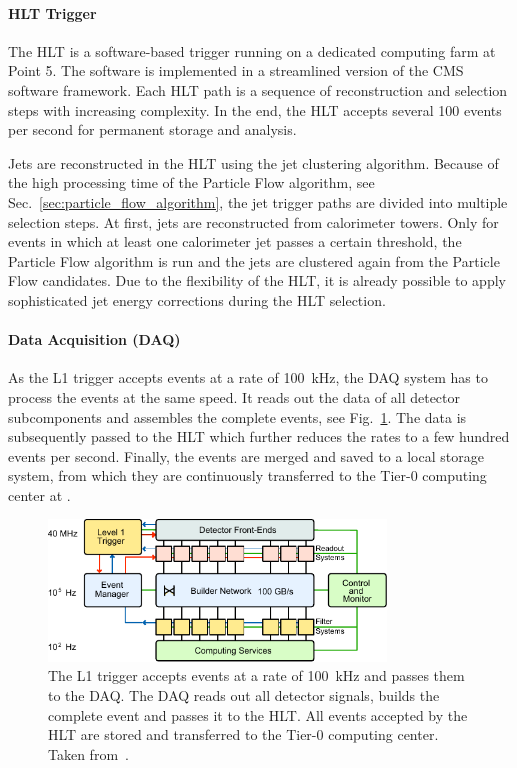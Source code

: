 \paragraph{HLT Trigger} 
The HLT is a software-based trigger running on a dedicated computing farm at
Point 5. The software is implemented in a streamlined version of the CMS
software framework. Each HLT path is a sequence of reconstruction and
selection steps with increasing complexity. In the end, the HLT accepts several
100 events per second for permanent storage and analysis.

Jets are reconstructed in the HLT using the \antikt jet clustering algorithm. Because of the
high processing time of the Particle Flow algorithm, see
Sec.~\ref{sec:particle_flow_algorithm}, the jet trigger paths are divided into
multiple selection steps. At first, jets are reconstructed from calorimeter
towers.  Only for events in which at least one calorimeter jet passes a certain
\pt threshold, the Particle Flow algorithm is run and the jets are clustered
again from the Particle Flow candidates. Due to the flexibility of the HLT, it
is already possible to apply sophisticated jet energy corrections during the HLT
 selection.

\paragraph{Data Acquisition (DAQ)}

As the L1 trigger accepts events at a rate of \SI{100}{\kilo\hertz}, the DAQ
system has to process the events at the same speed. It reads out the data of all
detector subcomponents and assembles the complete events, see
Fig.~\ref{fig:cms:daq_system}. The data is subsequently passed to the HLT  which
further reduces the rates to a few hundred events per second. Finally, the events are
merged and saved to a local storage system, from which they are continuously
transferred to the Tier-0 computing center at \CERN.

\begin{figure}[h!tp]
    \centering
    \includegraphics[width=0.8\textwidth]{figures/experimental_setup/cms_daq_new.pdf}\hfill
    \caption[The DAQ System of CMS]{The L1 trigger accepts events at a rate of
        \SI{100}{\kilo\hertz} and passes them to the DAQ. The DAQ reads out
        all detector signals, builds the complete event and passes it to the
        HLT. All events accepted by the HLT are stored and transferred to the
        Tier-0 computing center. Taken from~\cite{Bayatian:922757}.}
    \label{fig:cms:daq_system}
\end{figure}

